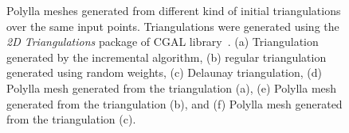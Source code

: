 \documentclass[lineno,pdflatex,sn-mathphys]{sn-jnl}%
\theoremstyle{thmstyleone}%
\theoremstyle{thmstyletwo}%
\theoremstyle{thmstylethree}%
\begin{document}
\begin{figure}[!h]
    \caption{Polylla meshes generated from different kind of initial triangulations over the same input points. Triangulations were generated using the {\em 2D  Triangulations}  package of CGAL library~\cite{cgal:y-t2-21b}. (a) Triangulation generated by the incremental algorithm, (b) regular triangulation generated using random weights, (c) Delaunay triangulation, (d) Polylla mesh generated from the triangulation (a), (e) Polylla mesh generated from the triangulation (b), and (f) Polylla mesh generated from the triangulation (c).}

\label{figs:diff_triangulation} 
\end{figure}
\end{document}
